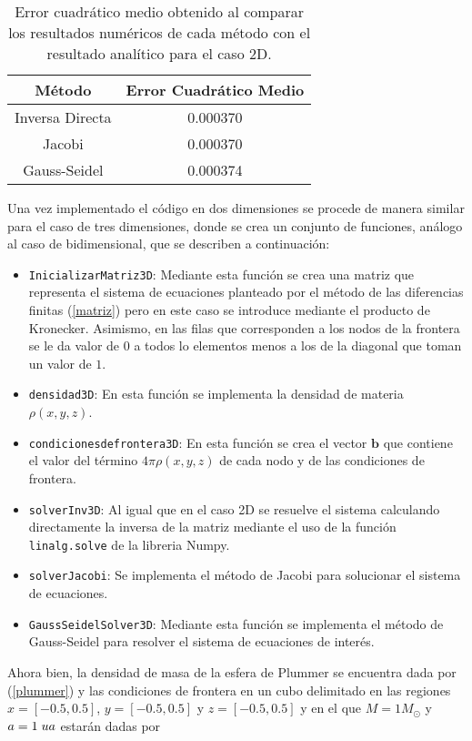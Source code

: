 \documentclass[reprint,amsmath,amssymb,aps]{revtex4-1}
\begin{document}
\begin{table}
    \centering
    \begin{tabular}{|c|c|} \hline
    \rowcolor[HTML]{EFEFEF}
         Método & Error Cuadrático Medio \\ \hline
         Inversa Directa &  0.000370 \\ \hline
         Jacobi & 0.000370\\ \hline
         Gauss-Seidel & 0.000374\\ \hline
    \end{tabular}
    \caption{Error cuadrático medio obtenido al comparar los resultados numéricos de cada método con el resultado analítico para el caso 2D.}
    \label{tab:1}
\end{table}
Una vez implementado el código en dos dimensiones se procede de manera similar para el caso de tres dimensiones, donde se crea un conjunto de funciones, análogo al caso de bidimensional, que se describen a continuación:
\begin{itemize}
    \item \texttt{InicializarMatriz3D}: Mediante esta función se crea una matriz que representa el sistema de ecuaciones planteado por el método de las diferencias finitas (\ref{matriz}) pero en este caso se introduce mediante el producto de Kronecker. Asimismo, en las filas que corresponden a los nodos de la frontera se le da valor de $0$ a todos lo elementos menos a los de la diagonal que toman un valor de $1$.
    \item \texttt{densidad3D}: En esta función se implementa la densidad de materia $\rho(x,y,z)$.
    \item \texttt{condicionesdefrontera3D}: En esta función se crea el vector $\textbf{b}$ que contiene el valor del término $4\pi \rho(x,y,z)$ de cada nodo y de las condiciones de frontera.
    \item \texttt{solverInv3D}: Al igual que en el caso 2D se resuelve el sistema calculando directamente la inversa de la matriz mediante el uso de la función \texttt{linalg.solve} de la libreria Numpy.
    \item \texttt{solverJacobi}: Se implementa el método de Jacobi para solucionar el sistema de ecuaciones.
    \item \texttt{GaussSeidelSolver3D}: Mediante esta función se implementa el método de Gauss-Seidel para resolver el sistema de ecuaciones de interés.
\end{itemize}
Ahora bien, la densidad de masa de la esfera de Plummer se encuentra dada por (\ref{plummer}) y las condiciones de frontera en un cubo delimitado en las regiones $x=[-0.5,0.5]$, $y=[-0.5,0.5]$ y $z=[-0.5,0.5]$ y en el que $M=1 M_{\odot}$ y $a=1 \hspace{0.1 cm} ua$ estarán dadas por
\end{document}
